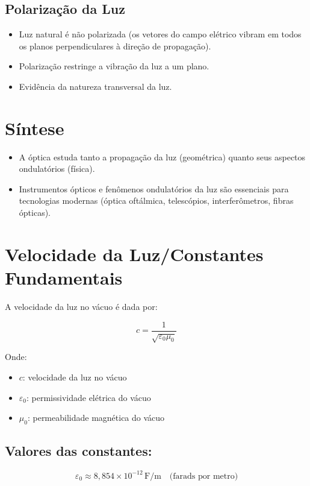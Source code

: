 \documentclass[a4paper,12pt]{article}
\begin{document}
\begin{multicols}{2}
\subsection{Polarização da Luz}
\begin{itemize}
    \item Luz natural é não polarizada (os vetores do campo elétrico vibram em todos os planos perpendiculares à direção de propagação).
    \item Polarização restringe a vibração da luz a um plano.
    \item Evidência da natureza transversal da luz.
\end{itemize}

\section{Síntese}
\begin{itemize}
    \item A óptica estuda tanto a propagação da luz (geométrica) quanto seus aspectos ondulatórios (física).
    \item Instrumentos ópticos e fenômenos ondulatórios da luz são essenciais para tecnologias modernas (óptica oftálmica, telescópios, interferômetros, fibras ópticas).
\end{itemize}

\section*{Velocidade da Luz/Constantes Fundamentais}

A velocidade da luz no vácuo é dada por:

\[
c = \frac{1}{\sqrt{\varepsilon_0 \mu_0}}
\]

Onde:
\begin{itemize}
  \item \( c \): velocidade da luz no vácuo
  \item \( \varepsilon_0 \): permissividade elétrica do vácuo
  \item \( \mu_0 \): permeabilidade magnética do vácuo
\end{itemize}

\subsection{Valores das constantes:}

\[
\varepsilon_0 \approx 8{,}854 \times 10^{-12} \, \text{F/m}
\quad \text{(farads por metro)}
\]


\end{multicols}
\end{document}
